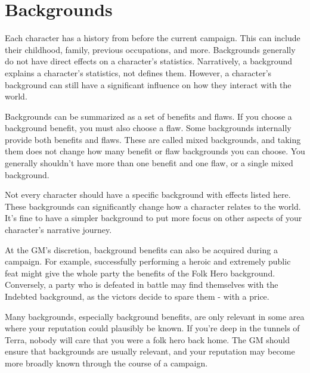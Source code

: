 \section{Backgrounds}\label{Backgrounds}
  Each character has a history from before the current campaign.
  This can include their childhood, family, previous occupations, and more.
  Backgrounds generally do not have direct effects on a character's statistics.
  Narratively, a background explains a character's statistics, not defines them.
  However, a character's background can still have a significant influence on how they interact with the world.

  Backgrounds can be summarized as a set of benefits and flaws.
  If you choose a background benefit, you must also choose a flaw.
  Some backgrounds internally provide both benefits and flaws.
  These are called mixed backgrounds, and taking them does not change how many benefit or flaw backgrounds you can choose.
  You generally shouldn't have more than one benefit and one flaw, or a single mixed background.

  Not every character should have a specific background with effects listed here.
  These backgrounds can significantly change how a character relates to the world.
  It's fine to have a simpler background to put more focus on other aspects of your character's narrative journey.

  At the GM's discretion, background benefits can also be acquired during a campaign.
  For example, successfully performing a heroic and extremely public feat might give the whole party the benefits of the Folk Hero background.
  Conversely, a party who is defeated in battle may find themselves with the Indebted background, as the victors decide to spare them - with a price.

  Many backgrounds, especially background benefits, are only relevant in some area where your reputation could plausibly be known.
  If you're deep in the tunnels of Terra, nobody will care that you were a folk hero back home.
  The GM should ensure that backgrounds are usually relevant, and your reputation may become more broadly known through the course of a campaign.

